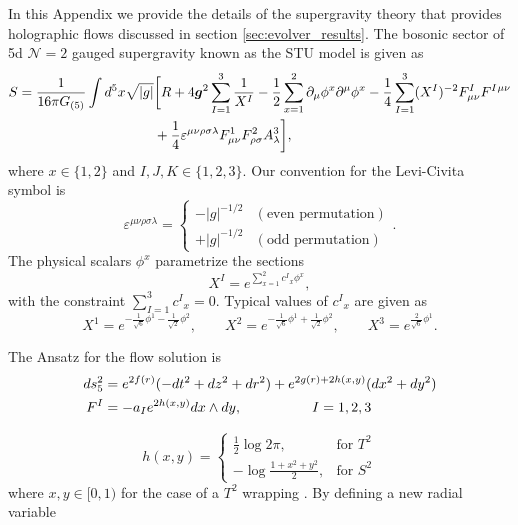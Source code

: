 \documentclass[11 pt]{article}
\newcommand{\fft}[2]{\frac{#1}{#2}}
\begin{document}
In this Appendix we provide the details of the supergravity theory that provides holographic flows discussed in section  \ref{sec:evolver_results}. The bosonic sector of 5d $\mathcal N=2$ gauged supergravity known as the STU model is given as
%
\begin{equation}
\begin{split}
	S&=\fft{1}{16\pi G_{(5)}}\int d^5x\sqrt{|g|}\bigg[R+4\boldsymbol{g}^2\sum_{I=1}^3\fft{1}{X^I}-\fft12\sum_{x=1}^2\partial_\mu\phi^x\partial^\mu\phi^x-\fft14\sum_{I=1}^3(X^I)^{-2}F^I_{\mu\nu}F^I{}^{\mu\nu}\\
	&\kern10em+\fft{1}{4}\varepsilon^{\mu\nu\rho\sigma\lambda}F^1_{\mu\nu}F^2_{\rho\sigma}A^3_\lambda\bigg],
\end{split}\label{N=2:sugra:action:5d}
\end{equation}
%
where $x \in\{1,2\}$  and $I,J,K\in\{1,2,3\}$. Our convention for the Levi-Civita symbol is 
%
\begin{equation}
\varepsilon^{\mu\nu\rho\sigma\lambda}=\begin{cases}
	-|g|^{-1/2} & (\text{even permutation})\\
	+|g|^{-1/2} & (\text{odd permutation})
\end{cases}.
\end{equation}
%
The physical scalars $\phi^x$  parametrize the sections
%
\begin{equation}
    X^I=e^{\sum_{x=1}^2c^I{}_x\phi^x},
\end{equation}
%
with the constraint $\sum_{I=1}^3c^I{}_x=0$. Typical values of $c^I{}_x$ are given as
%
\begin{equation}
    X^1=e^{-\fft{1}{\sqrt6}\phi^1-\fft{1}{\sqrt2}\phi^2},\qquad X^2=e^{-\fft{1}{\sqrt6}\phi^1+\fft{1}{\sqrt2}\phi^2},\qquad X^3=e^{\fft{2}{\sqrt6}\phi^1}.
\end{equation}
%

The Ansatz for the flow solution is 
\begin{align}\label{metric_ansatz}
    ds_5^2&=e^{2f(r)}(-dt^2+dz^2+dr^2) + e^{2g(r)+2h(x,y)}(dx^2+dy^2)\\
    F^I&=-a_I e^{2h(x,y)}dx\wedge dy,\hspace{50 pt}I=1,2,3\nonumber
\end{align}

\begin{equation}
     h(x,y) =
  \begin{cases}
    \frac{1}{2}\log{2\pi}, & \text{for } T^2 \\
    -\log{\frac{1+x^2+y^2}{2}}, & \text{for } S^2
  \end{cases}
\end{equation}
where $x,y\in[0,1)$ for the case of a $T^2$ wrapping \cite{Benini:2013cda}. By defining a new radial variable 
\end{document}
